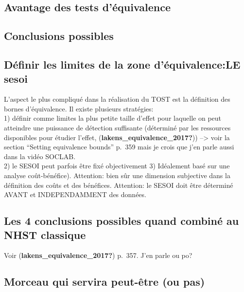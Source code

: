 \documentclass[
  english,
  man]{apa6}
\begin{document}
\hypertarget{avantage-des-tests-duxe9quivalence}{%
\subsection{Avantage des tests d'équivalence}\label{avantage-des-tests-duxe9quivalence}}

\hypertarget{conclusions-possibles}{%
\subsection{Conclusions possibles}\label{conclusions-possibles}}

\hypertarget{duxe9finir-les-limites-de-la-zone-duxe9quivalencele-sesoi}{%
\subsection{Définir les limites de la zone d'équivalence:LE sesoi}\label{duxe9finir-les-limites-de-la-zone-duxe9quivalencele-sesoi}}

L'aspect le plus compliqué dans la réalisation du TOST est la définition des bornes d'équivalence. Il existe plusieurs stratégies:\\
1) définir comme limites la plus petite taille d'effet pour laquelle on peut atteindre une puissance de détection suffisante (déterminé par les ressources disponibles pour étudier l'effet, (\textbf{lakens\_equivalence\_2017?})) --\textgreater{} voir la section ``Setting equivalence bounds'' p.~359 mais je crois que j'en parle aussi dans la vidéo SOCLAB.\\
2) le SESOI peut parfois être fixé objectivement
3) Idéalement basé sur une analyse coût-bénéfice). Attention: bien sûr une dimension subjective dans la définition des coûts et des bénéfices.
Attention: le SESOI doit être déterminé AVANT et INDEPENDAMMENT des données.

\hypertarget{les-4-conclusions-possibles-quand-combinuxe9-au-nhst-classique}{%
\subsection{Les 4 conclusions possibles quand combiné au NHST classique}\label{les-4-conclusions-possibles-quand-combinuxe9-au-nhst-classique}}

Voir (\textbf{lakens\_equivalence\_2017?}) p.~357. J'en parle ou po?

\hypertarget{morceau-qui-servira-peut-uxeatre-ou-pas}{%
\subsection{Morceau qui servira peut-être (ou pas)}\label{morceau-qui-servira-peut-uxeatre-ou-pas}}
\end{document}
